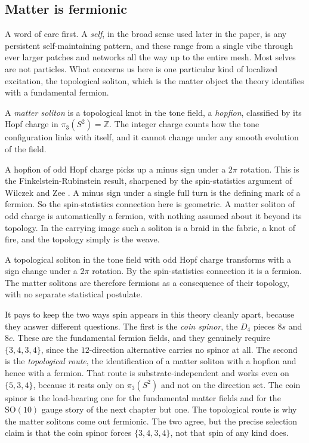 \subsection{Matter is fermionic}

A word of care first. A \emph{self}, in the broad sense used later in the paper, is any persistent
self-maintaining pattern, and these range from a single vibe through ever larger patches and networks all the way
up to the entire mesh. Most selves are not particles. What concerns us here is one particular kind of localized
excitation, the topological soliton, which is the matter object the theory identifies with a fundamental fermion.

\begin{definition}
A \emph{matter soliton} is a topological knot in the tone field, a \emph{hopfion}, classified by its Hopf charge
in $\pi_3(S^2) = \mathbb{Z}$. The integer charge counts how the tone configuration links with itself, and it
cannot change under any smooth evolution of the field.
\end{definition}

A hopfion of odd Hopf charge picks up a minus sign under a $2\pi$ rotation. This is the Finkelstein-Rubinstein
result, sharpened by the spin-statistics argument of Wilczek and Zee \cite{finkelsteinrubinstein1968,
wilczekzee1983}. A minus sign under a single full turn is the defining mark of a fermion. So the spin-statistics
connection here is geometric. A matter soliton of odd charge is automatically a fermion, with nothing assumed
about it beyond its topology. In the carrying image such a soliton is a braid in the fabric, a knot of fire, and
the topology simply is the weave.

\begin{proposition}
A topological soliton in the tone field with odd Hopf charge transforms with a sign change under a $2\pi$
rotation. By the spin-statistics connection it is a fermion. The matter solitons are therefore fermions as a
consequence of their topology, with no separate statistical postulate.
\end{proposition}

It pays to keep the two ways spin appears in this theory cleanly apart, because they answer different questions.
The first is the \emph{coin spinor}, the $D_4$ pieces $8s$ and $8c$. These are the fundamental fermion fields,
and they genuinely require $\{3,4,3,4\}$, since the $12$-direction alternative carries no spinor at all. The
second is the \emph{topological route}, the identification of a matter soliton with a hopfion and hence with a
fermion. That route is substrate-independent and works even on $\{5,3,4\}$, because it rests only on $\pi_3(S^2)$
and not on the direction set. The coin spinor is the load-bearing one for the fundamental matter fields and for
the $\mathrm{SO}(10)$ gauge story of the next chapter but one. The topological route is why the matter solitons
come out fermionic. The two agree, but the precise selection claim is that the coin spinor forces $\{3,4,3,4\}$, not that
spin of any kind does.

